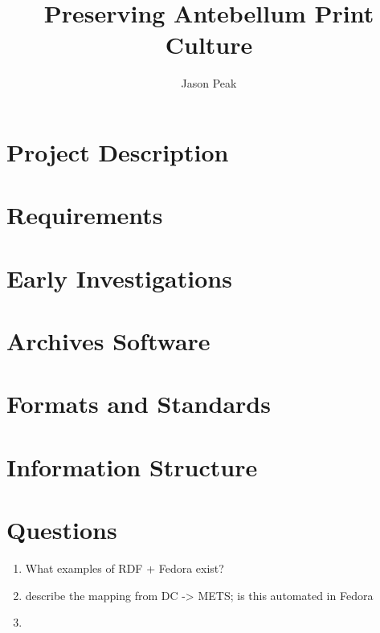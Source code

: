 \documentclass[oneside]{article}
\begin{document}
\title{Preserving Antebellum Print Culture}
\author{Jason Peak}
\maketitle


\def\projectname{Poe's Magazine World}
\def\apc{Antebellum Print Culture}
\def\bwj{\emph{The Broadway Journal}}
\def\slm{\emph{Southern Literary Messenger}}
\def\bgm{\emph{Burton's Gentleman's Magazine}}
\def\gm{\emph{Graham's Magazine}}
\def\maglist{\bgm, \bwj, \gm, and the \slm}
\def\needcite{[citation]}

\begin{abstract}

\end{abstract}

\section{Project Description}


%


\section{Requirements}


\section{Early Investigations}


\section{Archives Software}


\section{Formats and Standards}


\section{Information Structure}


\section{Questions}
\begin{enumerate}
  \item{What examples of RDF + Fedora exist?}
  \item{describe the mapping from DC -> METS; is this automated in Fedora}
  \item{}
\end{enumerate}


\end{document}
